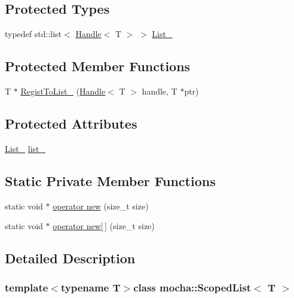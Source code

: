 \subsection*{Protected Types}
\begin{DoxyCompactItemize}
\item 
typedef std::list$<$ \hyperlink{classmocha_1_1_handle}{Handle}$<$ T $>$ $>$ \hyperlink{classmocha_1_1_scoped_list_a3fadd391a6a52177023df714c72500e1}{List\_\-}
\end{DoxyCompactItemize}
\subsection*{Protected Member Functions}
\begin{DoxyCompactItemize}
\item 
T $\ast$ \hyperlink{classmocha_1_1_scoped_list_a0f30068adb4062152cbdd93d912aceae}{RegistToList\_\-} (\hyperlink{classmocha_1_1_handle}{Handle}$<$ T $>$ handle, T $\ast$ptr)
\end{DoxyCompactItemize}
\subsection*{Protected Attributes}
\begin{DoxyCompactItemize}
\item 
\hyperlink{classmocha_1_1_scoped_list_a3fadd391a6a52177023df714c72500e1}{List\_\-} \hyperlink{classmocha_1_1_scoped_list_a2ba5cdd36f373368d33ba02395cc6542}{list\_\-}
\end{DoxyCompactItemize}
\subsection*{Static Private Member Functions}
\begin{DoxyCompactItemize}
\item 
static void $\ast$ \hyperlink{classmocha_1_1_scoped_list_a100457401ee7f2ff619a1511cc4d8078}{operator new} (size\_\-t size)
\item 
static void $\ast$ \hyperlink{classmocha_1_1_scoped_list_a5c86d14229c8fdbb43f86d3aa744eb70}{operator new\mbox{[}$\,$\mbox{]}} (size\_\-t size)
\end{DoxyCompactItemize}


\subsection{Detailed Description}
\subsubsection*{template$<$typename T$>$class mocha::ScopedList$<$ T $>$}



